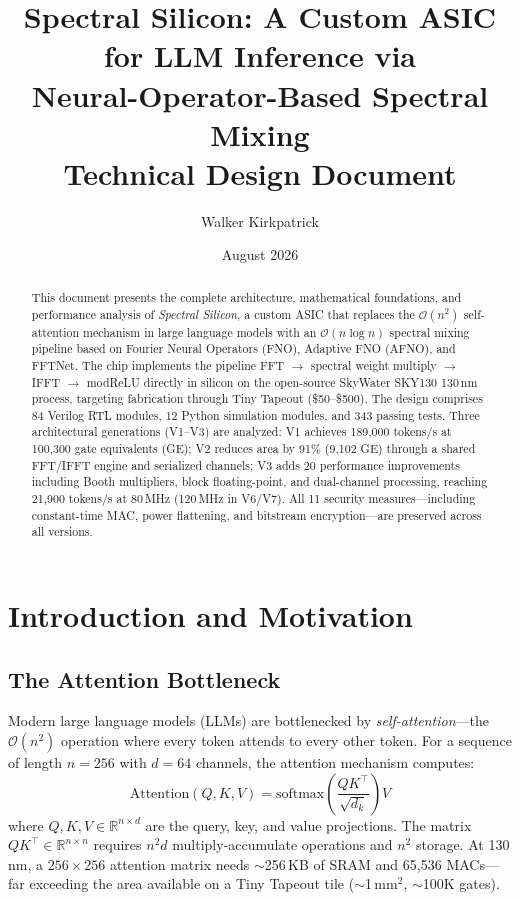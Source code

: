 \documentclass[11pt,a4paper]{article}
\title{\textbf{Spectral Silicon: A Custom ASIC for LLM Inference via\\
Neural-Operator-Based Spectral Mixing}\\[0.5em]
\large Technical Design Document}
\author{Walker Kirkpatrick}
\date{August 2026}
\theoremstyle{definition}
\theoremstyle{remark}
\newcommand{\R}{\mathbb{R}}
\newcommand{\bigO}{\mathcal{O}}
\begin{document}
\maketitle

\begin{abstract}
This document presents the complete architecture, mathematical foundations, and
performance analysis of \emph{Spectral Silicon}, a custom ASIC that replaces the
$\bigO(n^2)$ self-attention mechanism in large language models with an $\bigO(n \log n)$
spectral mixing pipeline based on Fourier Neural Operators (FNO), Adaptive FNO (AFNO),
and FFTNet. The chip implements the pipeline \textsc{FFT} $\to$ spectral weight multiply
$\to$ \textsc{IFFT} $\to$ modReLU directly in silicon on the open-source SkyWater
SKY130 130\,nm process, targeting fabrication through Tiny Tapeout (\$50--\$500).
The design comprises 84 Verilog RTL modules, 12 Python simulation modules, and 343
passing tests. Three architectural generations (V1--V3) are analyzed: V1 achieves
189{,}000 tokens/s at 100{,}300 gate equivalents (GE); V2 reduces area by 91\%
(9{,}102 GE) through a shared FFT/IFFT engine and serialized channels; V3 adds 20
performance improvements including Booth multipliers, block floating-point, and
dual-channel processing, reaching 21{,}900 tokens/s at 80\,MHz (120\,MHz in V6/V7).
All 11 security measures---including constant-time MAC, power flattening, and
bitstream encryption---are preserved across all versions.
\end{abstract}

\tableofcontents
\newpage

\section{Introduction and Motivation}

\subsection{The Attention Bottleneck}

Modern large language models (LLMs) are bottlenecked by \emph{self-attention}---the
$\bigO(n^2)$ operation where every token attends to every other token. For a
sequence of length $n=256$ with $d=64$ channels, the attention mechanism computes:
\begin{equation}
  \text{Attention}(Q, K, V) = \text{softmax}\!\left(\frac{QK^\top}{\sqrt{d_k}}\right) V
  \label{eq:attention}
\end{equation}
where $Q, K, V \in \R^{n \times d}$ are the query, key, and value projections. The
matrix $QK^\top \in \R^{n \times n}$ requires $n^2 d$ multiply-accumulate operations
and $n^2$ storage. At 130\,nm, a $256 \times 256$ attention matrix needs
$\sim$256\,KB of SRAM and 65{,}536 MACs---far exceeding the area available on a
Tiny Tapeout tile ($\sim$1\,mm$^2$, $\sim$100K gates).
\end{document}
